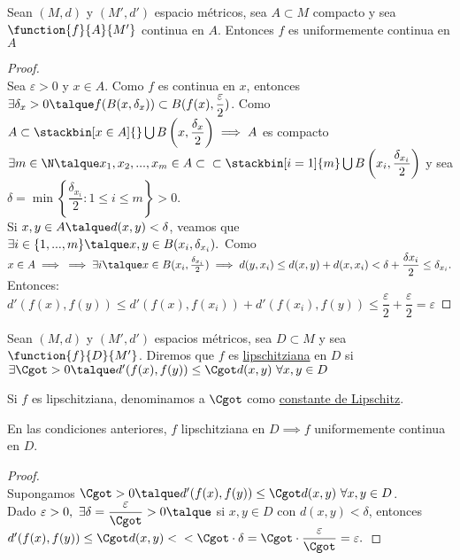 	\begin{proposicion} Sean $(M,d)$ y $(M',d')$ espacio métricos, sea $A\subset M$ compacto y sea $\function{f}{A}{M'}$ continua en $A$. Entonces $f$ es uniformemente continua en $A$
	\begin{proof}\ \\
Sea $\varepsilon>0$ y $x\in A$. Como $f$ es continua en $x$, entonces $\exists\delta_x>0\talque f(B(x,\delta_x))\subset B(f(x),\dfrac{\varepsilon}{2})$. Como $A\subset \stackbin[x\in A]{}\bigcup B\left(x,\dfrac{\delta_x}{2}\right)\implies A$ es compacto $\exists m\in\N\talque x_1,x_2,...,x_m\in A\subset\\\subset\stackbin[i=1]{m}\bigcup B\left(x_i,\dfrac{\delta_{x_i}}{2}\right)$ y sea $\delta=\min\left\{\dfrac{\delta_{x_i}}{2}:1\leq i\leq m\right\}>0$.\\
Si $x,y\in A\talque d(x,y)<\delta$, veamos que $\exists i\in \{1,...,m\}\talque x,y\in B(x_i,\delta_{x_i}).$ Como $x\in A\implies\\\implies \exists i\talque x\in B(x_i,\frac{\delta_{x_i}}{2})\implies d(y,x_i)\leq d(x,y)+d(x,x_i)<\delta+\dfrac{\delta{x_i}}{2}\leq\delta_{x_i}.$\\
	Entonces: $d'(f(x),f(y))\leq d'(f(x),f(x_i))+d'(f(x_i),f(y))\leq \dfrac{\varepsilon}{2} + \dfrac{\varepsilon}{2}=\varepsilon$
	\end{proof}
	\end{proposicion}
	
	\begin{defi} Sean $(M,d)$ y $(M',d')$ espacios métricos, sea $D\subset M$ y sea $\function{f}{D}{M'}$. Diremos que $f$ es \underline{lipschitziana} en $D$ si $\exists\Cgot>0\talque d'(f(x),f(y))\leq\Cgot d(x,y) \ \forall x,y\in D$
	\begin{nota} Si $f$ es lipschitziana, denominamos a $\Cgot$ como \underline{constante de Lipschitz}.
	\end{nota}
	\end{defi}
	
	\begin{proposicion} En las condiciones anteriores, $f$ lipschitziana en $D\implies f$ uniformemente continua en $D$.
	\begin{proof}\ \\
	Supongamos $\Cgot>0\talque d'(f(x),f(y))\leq \Cgot d(x,y)\ \forall x,y\in D$.\\
	Dado $\varepsilon >0,\ \exists\delta=\dfrac{\varepsilon}{\Cgot}>0\talque$ si $x,y\in D$ con $d(x,y)<\delta$, entonces $d'(f(x),f(y))\leq\Cgot d(x,y)<\\<\Cgot\cdot\delta=\Cgot\cdot\dfrac{\varepsilon}{\Cgot}=\varepsilon.$
	\end{proof}
	\end{proposicion}
	

